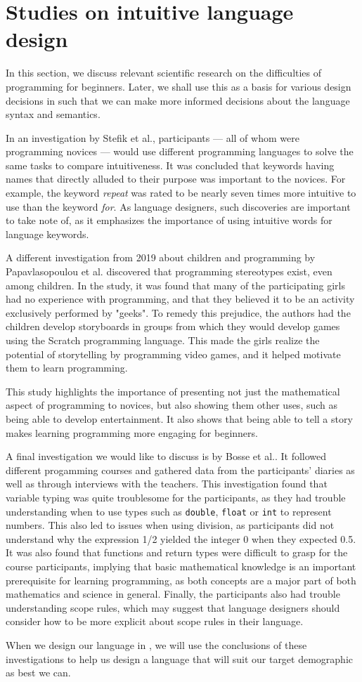 \section{Studies on intuitive language design} \label{sec:scientific_research}
In this section, we discuss relevant scientific research on the difficulties of programming for beginners.
Later, we shall use this as a basis for various design decisions in \dazel{} such that we can make more
informed decisions about the language syntax and semantics.

In an investigation by Stefik et al.\cite{stefik_empirical_2011}, participants — all of whom were
programming novices — would use different programming languages to solve the same tasks to compare intuitiveness.
It was concluded that keywords having names that directly alluded to their purpose was important to the novices.
For example, the keyword \emph{repeat} was rated to be nearly seven times more intuitive to use than the keyword \emph{for}.
As language designers, such discoveries are important to take note of, as it emphasizes the importance of using intuitive words for language keywords.

A different investigation from 2019 about children and programming by Papavlasopoulou et al.\cite{papavlasopoulou_exploring_2019} discovered that
programming stereotypes exist, even among children.
In the study, it was found that many of the participating girls had no experience with programming, and that they believed it
to be an activity exclusively performed by "geeks".
To remedy this prejudice, the authors had the children develop storyboards in groups from which they would develop games using the
Scratch programming language.
This made the girls realize the potential of storytelling by programming video games, and it helped motivate them to learn programming.

This study highlights the importance of presenting not just the mathematical aspect of programming to novices, but also
showing them other uses, such as being able to develop entertainment.
It also shows that being able to tell a story makes learning programming more engaging for beginners.


A final investigation we would like to discuss is by Bosse et al.\cite{bosseWhyProgrammingDifficult2017}.
It followed different progamming courses and gathered data from the participants' diaries as well as through interviews with the teachers.
This investigation found that variable typing was quite troublesome for the participants, as they had trouble understanding when to use
types such as \texttt{double}, \texttt{float} or \texttt{int} to represent numbers. This also led to issues when using division, as participants
did not understand why the expression 1/2 yielded the integer 0 when they expected 0.5.
It was also found that functions and return types were difficult to grasp for the course participants, implying that basic mathematical
knowledge is an important prerequisite for learning programming, as both concepts are a major part of both mathematics and science in general.
Finally, the participants also had trouble understanding scope rules, which may suggest that language designers should consider how to be more explicit about scope rules in their language.


When we design our language in , we will use the conclusions of these investigations to help us design a language that will suit our target demographic
as best we can.
